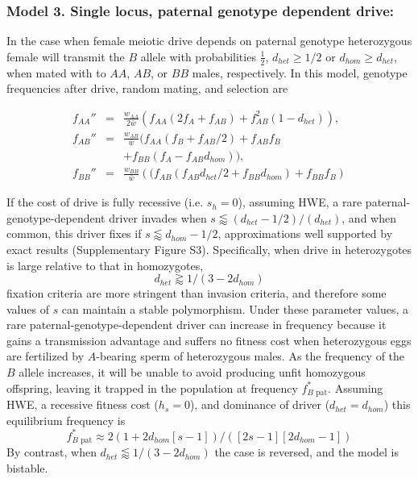 \documentclass{pnastwo}
\begin{document}
\begin{article}
\subsubsection{Model 3. Single locus, paternal genotype dependent drive:}
In the case when female meiotic drive depends on paternal genotype
 heterozygous female will transmit the $B$ allele 
  with probabilities  $\frac{1}{2}$,  $d_{het}\geq 1/2 $ or $d_{hom}\geq d_{het}$, 
 when mated with to $AA$, $AB$, or $BB$ males,  respectively. 
  In this model, genotype frequencies after drive, random mating, and selection are 
  
\begin{eqnarray*}
f_{AA}''&=&\frac{w_{AA}}{2\bar{w}}\left( f_{AA} (2 f_A + f_{AB} ) + f_{AB}^2 (1 - d_{het}) \right),\\
f_{AB}''&=&\frac{w_{AB}}{\bar{w}}\big(f_{AA} (f_B + f_{AB}/2) +  f_{AB} f_B \\&& + f_{BB}(f_A - f_{AB} d_{hom})\big),\\
f_{BB}''&=&\frac{w_{BB}}{\bar{w}}\left((f_{AB} (f_{AB} d_{het}/2 + f_{BB} d_{hom}) + f_{BB} f_B\right)
\end{eqnarray*}



If the cost of drive is fully recessive (i.e. $s_h=0$), assuming HWE, 
	a rare paternal-genotype-dependent driver invades when 
	$s\lessapprox (d_{het}-1/2)/(d_{het})$, and when common, this driver fixes if 
	$s\lessapprox d_{hom}-1/2$, approximations well supported by exact results (Supplementary Figure S3).
Specifically, when drive in heterozygotes is large relative to that in homozygotes, 
	\begin{equation} d_{het}  \gtrapprox 1/(3-2d_{hom}) \label{polymale} \end{equation}
	fixation criteria are more stringent than invasion criteria, 
	and therefore some values of $s$ can maintain a stable polymorphism. 
Under these parameter values, a rare paternal-genotype-dependent driver 
	can increase in frequency because it gains a transmission advantage and suffers 
	no fitness cost when heterozygous eggs are fertilized by 
	$A$-bearing sperm of heterozygous males. 
As the frequency of the $B$ allele increases, 
	it will be unable to 
	avoid producing unfit homozygous offspring, leaving it trapped in
	the population at frequency $f_{B\text{ pat}}^*$. 
Assuming HWE, a recessive fitness cost ($h_s=0$), and dominance of driver ($d_{het}=d_{hom}$) this equilibrium frequency is
\begin{equation}f_{B\text{ pat}}^*\approx2 (1 + 2d_{hom}[s - 1])/([2 s - 1][2d_{hom}- 1]) \label{eqmale} \end{equation}
By contrast, when $d_{het} \lessapprox 1/(3-2d_{hom})$ the case is reversed, and the model is bistable.
 

\end{article}
\end{document}
